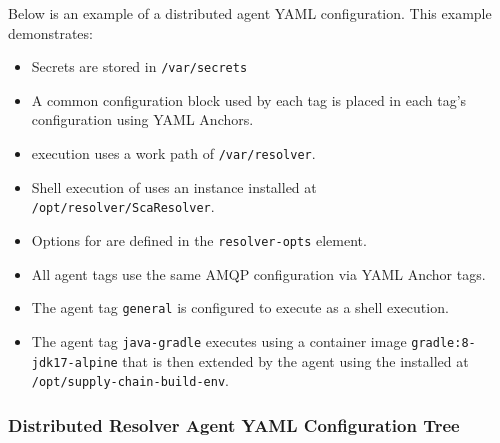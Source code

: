Below is an example of a distributed agent YAML configuration.  This example demonstrates:

\begin{itemize}
  \item Secrets are stored in \texttt{/var/secrets}
  \item A common configuration block used by each tag is placed in each tag's configuration using YAML Anchors.
  \item \scaresolver execution uses a work path of \texttt{/var/resolver}.
  \item Shell execution of \scaresolver uses an instance installed at\\\texttt{/opt/resolver/ScaResolver}.
  \item Options for \scaresolver are defined in the \texttt{resolver-opts} element.
  \item All agent tags use the same AMQP configuration via YAML Anchor tags.
  \item The agent tag \texttt{general} is configured to execute \scaresolver as a shell execution.
  \item The agent tag \texttt{java-gradle} executes \scaresolver using a container image \texttt{gradle:8-jdk17-alpine} that
    is then extended by the agent using the \toolkit installed at \texttt{/opt/supply-chain-build-env}.
\end{itemize}




\pagebreak

\subsubsection{Distributed Resolver Agent YAML Configuration Tree}\label{sec:agent-yaml-root}

